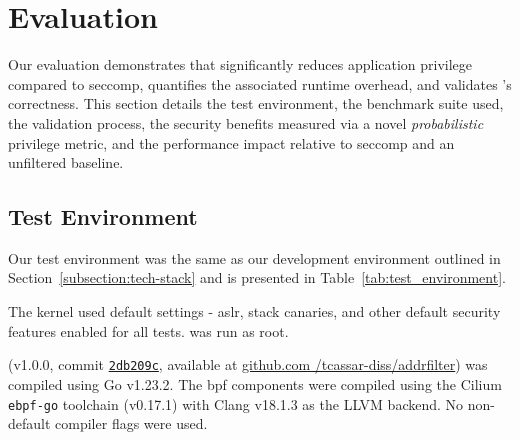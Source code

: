 \section{Evaluation}\label{sec:evaluation}

\iffalse
    Gavin wants to see:
    - What is the max privilege score that an application can have?
    - Diagram about system call distribution
\fi

Our evaluation demonstrates that \af significantly reduces application
privilege compared to seccomp, quantifies the associated runtime overhead, and
validates \af's correctness. This section details the test environment, the
benchmark suite used, the validation process, the security benefits measured
via a novel \textit{probabilistic} privilege metric, and the performance impact 
relative to seccomp and an unfiltered baseline.  

\subsection{Test Environment}

Our test environment was the same as our development environment outlined in
Section~\ref{subsection:tech-stack} and is presented in
Table~\ref{tab:test_environment}.

The kernel used default settings - \ac{aslr}, stack
canaries, and other default security features enabled for all tests.
\af was run as root.

\af (v1.0.0, commit
\href{https://github.com/tcassar-diss/addrfilter/tree/2bd209c630df3509d4ac721d018dabab94305dde}{\texttt{2db209c}},
available at
\href{https://github.com/tcassar-diss/addrfilter/releases/tag/v1.0}{github.com
/tcassar-diss/addrfilter}) was compiled using Go v1.23.2. The \ac{bpf} components
were compiled using the Cilium \texttt{ebpf-go} toolchain (v0.17.1) with
Clang v18.1.3 as the LLVM backend. No non-default compiler flags were used.


